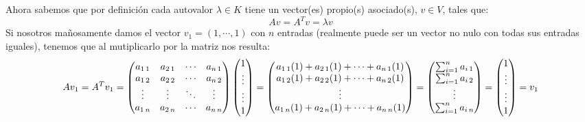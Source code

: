 Ahora sabemos que por definici\'on cada autovalor $\lambda\in K$ tiene un vector(es) propio(s) asociado(s), $v\in V$, tales que:
\[Av=A^Tv=\lambda v\]
Si nosotros mañosamente damos el vector $v_1=(1,\cdots, 1)$ con $n$ entradas (realmente puede ser un vector no nulo con todas sus entradas iguales), tenemos que al mutiplicarlo por la matriz nos resulta:
\[Av_1=A^Tv_1= \begin{pmatrix}
	a_{1\hspace{0.5mm}1} & a_{2\hspace{0.5mm}1} &\cdots& a_{n\hspace{0.5mm}1} \\
	a_{1\hspace{0.5mm}2} & a_{2\hspace{0.5mm}2} &\cdots& a_{n\hspace{0.5mm}2} \\\vdots&\vdots&\ddots&\vdots\\
	a_{1\hspace{0.5mm}n} & a_{2\hspace{0.5mm}n} &\cdots& a_{n\hspace{0.5mm}n}\end{pmatrix}\begin{pmatrix}
	1 \\
	\vdots\\\vdots\\1\end{pmatrix}=\begin{pmatrix}
	a_{1\hspace{0.5mm}1}(1)+ a_{2\hspace{0.5mm}1}(1)+\cdots+ a_{n\hspace{0.5mm}1}(1) \\
	a_{1\hspace{0.5mm}2}(1)+ a_{2\hspace{0.5mm}2}(1)+\cdots+ a_{n\hspace{0.5mm}2}(1) \\\vdots\\a_{1\hspace{0.5mm}n}(1)+ a_{2\hspace{0.5mm}n}(1)+\cdots+ a_{n\hspace{0.5mm}n}(1) \\\end{pmatrix}=\begin{pmatrix}
	\sum_{i=1}^n a_{i\hspace{0.5mm}1}\\
	\sum_{i=1}^n a_{i\hspace{0.5mm}2}\\\vdots\\\sum_{i=1}^n a_{i\hspace{0.5mm}n}\end{pmatrix}=\begin{pmatrix}
	1 \\
	\vdots\\\vdots\\1\end{pmatrix}=v_1\]
